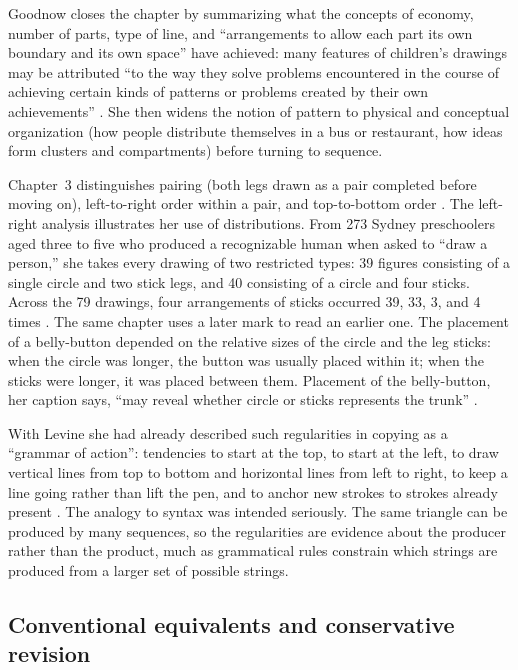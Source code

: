 \documentclass[11pt]{article}
\theoremstyle{remark}
\begin{document}
Goodnow closes the chapter by summarizing what the concepts of economy, number of parts, type of line, and ``arrangements to allow each part its own boundary and its own space'' have achieved: many features of children's drawings may be attributed ``to the way they solve problems encountered in the course of achieving certain kinds of patterns or problems created by their own achievements'' \cite[p.~57]{goodnow1977}. She then widens the notion of pattern to physical and conceptual organization (how people distribute themselves in a bus or restaurant, how ideas form clusters and compartments) before turning to sequence.

Chapter~3 distinguishes pairing (both legs drawn as a pair completed before moving on), left-to-right order within a pair, and top-to-bottom order \cite[p.~61]{goodnow1977}. The left-right analysis illustrates her use of distributions. From 273 Sydney preschoolers aged three to five who produced a recognizable human when asked to ``draw a person,'' she takes every drawing of two restricted types: 39 figures consisting of a single circle and two stick legs, and 40 consisting of a circle and four sticks. Across the 79 drawings, four arrangements of sticks occurred 39, 33, 3, and 4 times \cite[p.~61]{goodnow1977}. The same chapter uses a later mark to read an earlier one. The placement of a belly-button depended on the relative sizes of the circle and the leg sticks: when the circle was longer, the button was usually placed within it; when the sticks were longer, it was placed between them. Placement of the belly-button, her caption says, ``may reveal whether circle or sticks represents the trunk'' \cite[p.~72]{goodnow1977}.

With Levine she had already described such regularities in copying as a ``grammar of action'': tendencies to start at the top, to start at the left, to draw vertical lines from top to bottom and horizontal lines from left to right, to keep a line going rather than lift the pen, and to anchor new strokes to strokes already present \cite{goodnow1973grammar}. The analogy to syntax was intended seriously. The same triangle can be produced by many sequences, so the regularities are evidence about the producer rather than the product, much as grammatical rules constrain which strings are produced from a larger set of possible strings.

\subsection{Conventional equivalents and conservative revision}
\end{document}
